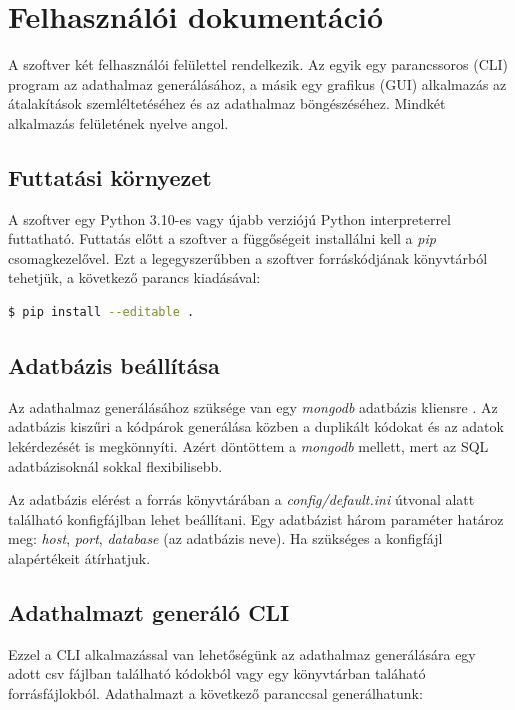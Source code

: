 \chapter{Felhasználói dokumentáció}
\label{ch:user}

A szoftver két felhasználói felülettel rendelkezik.
Az egyik egy parancssoros (CLI) program az adathalmaz generálásához,
a másik egy grafikus (GUI) alkalmazás az átalakítások szemléltetéséhez és az adathalmaz böngészéséhez.
Mindkét alkalmazás felületének nyelve angol.

\section{Futtatási környezet}

A szoftver egy Python 3.10-es vagy újabb verziójú Python interpreterrel futtatható.
Futtatás előtt a szoftver a függőségeit installálni kell a \emph{pip} csomagkezelővel.
Ezt a legegyszerűbben a szoftver forráskódjának könyvtárból tehetjük,
a következő parancs kiadásával:

\begin{lstlisting}[language=bash]
	$ pip install --editable .
\end{lstlisting}

\section{Adatbázis beállítása}

Az adathalmaz generálásához szüksége van egy \emph{mongodb} adatbázis kliensre \cite{installMongodb}.
Az adatbázis kiszűri a kódpárok generálása közben a duplikált kódokat
és az adatok lekérdezését is megkönnyíti.
Azért döntöttem a \emph{mongodb} mellett, mert az SQL adatbázisoknál sokkal flexibilisebb.

Az adatbázis elérést a forrás könyvtárában a \emph{config/default.ini} útvonal alatt található
konfigfájlban lehet beállítani.
Egy adatbázist három paraméter határoz meg: \emph{host}, \emph{port}, \emph{database} (az adatbázis neve).
Ha szükséges a konfigfájl alapértékeit átírhatjuk.

\section{Adathalmazt generáló CLI}

Ezzel a CLI alkalmazással van lehetőségünk az adathalmaz generálására egy
adott csv fájlban található kódokból vagy egy könyvtárban taláható forrásfájlokból.
Adathalmazt a következő paranccsal generálhatunk:

